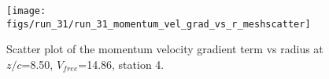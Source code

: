 \begin{figure}[H]
\centering
\texttt{[image: figs/run\_31/run\_31\_momentum\_vel\_grad\_vs\_r\_meshscatter]}
\caption{Scatter plot of the momentum velocity gradient term vs radius at $z/c$=8.50, $V_{free}$=14.86, station 4.}
\label{fig:run_31_momentum_vel_grad_vs_r_meshscatter}
\end{figure}


